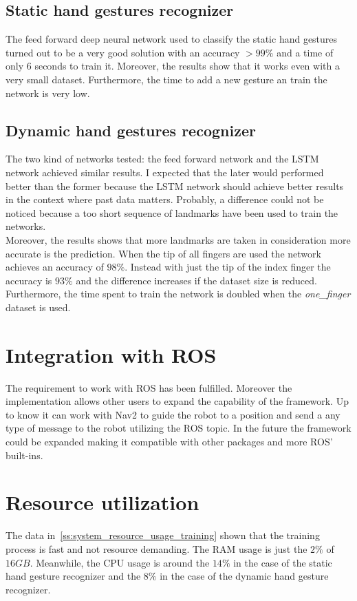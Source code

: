 \documentclass[../thesis.tex]{subfiles}
\begin{document}
\subsection{Static hand gestures recognizer}
The feed forward deep neural network used to classify the static hand gestures turned out to be a very good solution with an accuracy $> 99\%$ and a time of only $6$ seconds to train it. Moreover, the results show that it works even with a very small dataset. Furthermore, the time to add a new gesture an train the network is very low.  

\subsection{Dynamic hand gestures recognizer}
The two kind of networks tested: the feed forward network and the \acrshort{LSTM} network achieved similar results. I expected that the later would performed better than the former because the \acrshort{LSTM} network should achieve better results in the context where past data matters. Probably, a difference could not be noticed because a too short sequence of landmarks have been used to train the networks.\\

Moreover, the results shows that more landmarks are taken in consideration more accurate is the prediction. When the tip of all fingers are used the network achieves an accuracy of $98\%$. Instead with just the tip of the index finger the accuracy is $93\%$ and the difference increases if the dataset size is reduced. Furthermore, the time spent to train the network is doubled when the \textit{one\_finger} dataset is used. 

\section{Integration with ROS}
The requirement to work with \acrshort{ROS} has been fulfilled. Moreover the implementation allows other users to expand the capability of the framework. Up to know it can work with Nav2 to guide the robot to a position and send a any type of message to the robot utilizing the \acrshort{ROS} topic. In the future the framework could be expanded making it compatible with other packages and more \acrshort{ROS}' built-ins.

\section{Resource utilization}
The data in~\ref{ss:system_resource_usage_training} shown that the training process is fast and not resource demanding. The RAM usage is just the $2\%$ of $16GB$. Meanwhile, the CPU usage is around the $14\%$ in the case of the static hand gesture recognizer and the $8\%$ in the case of the dynamic hand gesture recognizer.\\
\end{document}
